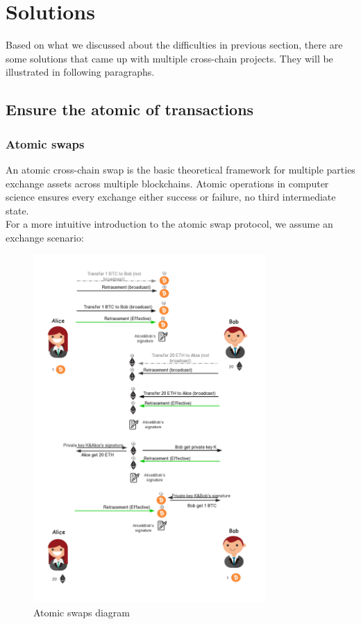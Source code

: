 \section{Solutions}
\label{sec:sol}

\noindent Based on what we discussed about the difficulties in previous section, there are some solutions that came up with multiple cross-chain projects. They will be illustrated in following paragraphs.
\subsection{Ensure the atomic of transactions}

\subsubsection{Atomic swaps}
\noindent An atomic cross-chain swap\cite{herlihy2018atomic} is the basic theoretical framework for multiple parties exchange assets across multiple blockchains. Atomic operations in computer science ensures every exchange either success or failure, no third intermediate state.\\
\noindent For a more intuitive introduction to the atomic swap protocol, we assume an exchange scenario:
   \begin{figure}[H]
    \includegraphics[width=0.79\textwidth]{./figures/atomic_swaps.png}
	\centering
    \caption{Atomic swaps diagram}%
    \centering
    \label{fig:atomic}
    \end{figure}
